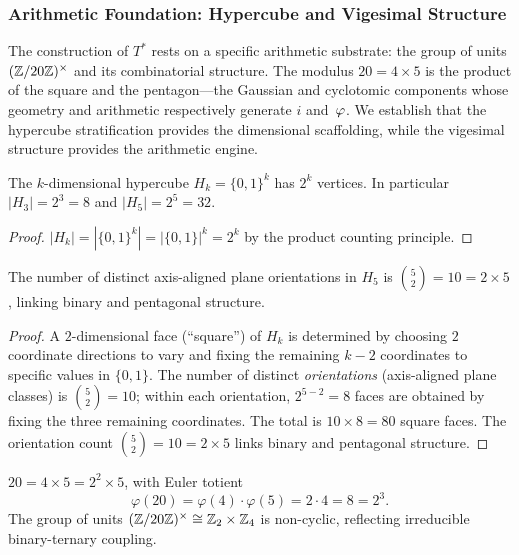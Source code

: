 \subsubsection{Arithmetic Foundation: Hypercube and Vigesimal Structure}\label{sssec:hypercube}

The construction of $T^*$ rests on a specific arithmetic substrate: the
group of units $(\mathbb{Z}/20\mathbb{Z})^\times$ and its combinatorial structure.  The modulus
$20=4\times 5$ is the product of the square and the 
pentagon---the Gaussian and cyclotomic components whose geometry and 
arithmetic respectively generate $i$ and~$\varphi$.  We establish that 
the hypercube stratification provides the dimensional scaffolding, while 
the vigesimal structure provides the arithmetic engine.

\begin{Theorem}\label{thm:hypercube}
The $k$-dimensional hypercube $H_k = \{0,1\}^k$ has $2^k$ vertices. In
particular $|H_3| = 2^3 = 8$ and $|H_5| = 2^5 = 32$.
\end{Theorem}

\begin{proof}
$|H_k| = |\{0,1\}^k| = |\{0,1\}|^k = 2^k$ by the product counting
principle.
\end{proof}

\begin{Proposition}\label{prop:pentagonal-planes}
The number of distinct axis-aligned plane orientations in $H_5$ is
$\binom{5}{2} = 10 = 2\times 5$, linking binary and pentagonal structure.
\end{Proposition}

\begin{proof}
A $2$-dimensional face (``square'') of $H_k$ is determined by choosing $2$
coordinate directions to vary and fixing the remaining $k-2$ coordinates to
specific values in $\{0,1\}$.  The number of distinct \emph{orientations}
(axis-aligned plane classes) is $\binom{5}{2}=10$; within each orientation,
$2^{5-2}=8$ faces are obtained by fixing the three remaining coordinates.
The total is $10\times 8=80$ square faces.  The orientation count 
$\binom{5}{2} = 10 = 2\times 5$ links binary and pentagonal structure.
\end{proof}

\begin{Proposition}\label{prop:vigesimal}
$20 = 4\times 5 = 2^2\times 5$, with Euler totient
\begin{equation}\label{eq:vigesimal-totient}
  \varphi(20) = \varphi(4)\cdot\varphi(5) = 2\cdot 4 = 8 = 2^3.
\end{equation}
The group of units $(\mathbb{Z}/20\mathbb{Z})^\times \cong \mathbb{Z}_2\times\mathbb{Z}_4$ is
non-cyclic, reflecting irreducible binary-ternary coupling.
\end{Proposition}

